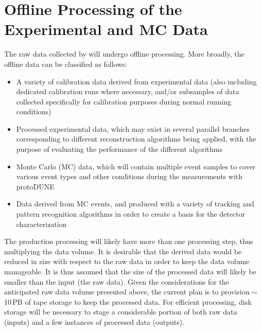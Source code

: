\section{Offline Processing of the Experimental and MC Data}
\label{sec:protodune-offline}

The raw data collected by \pd will undergo offline processing. More broadly, the offline data
can be classified as follows:
\begin{itemize}

\item A variety of calibration data derived from experimental data (also including dedicated calibration
runs where necessary, and/or subsamples of data collected specifically for calibration
purposes during normal running conditions)

\item Processed experimental data, which may exist in several parallel branches corresponding to
different reconstruction algorithms being applied, with the purpose of evaluating the performance
of the different algorithms

\item Monte Carlo (MC) data, which will contain multiple event samples to cover various event types
and other conditions during the measurements with protoDUNE

\item Data derived from MC events, and produced with a variety of tracking and pattern recognition algorithms
in order to create a basis for the detector characterization

\end{itemize}

\noindent The production processing will likely have more than one processing step,
thus multiplying the data volume. It is desirable that the derived data would be reduced
in size with respect to the raw data in order to keep the data volume manageable.
It is thus assumed that the size of the processed data will likely be smaller than the input (the raw data). 
Given the considerations for the anticipated raw data volume presented above,
the current plan is to provision $\sim$10\,PB of tape storage to keep the processed data. 
For efficient processing, disk storage will be necessary
to stage a considerable portion of both raw data (inputs) and a few instances of processed data (outputs).


